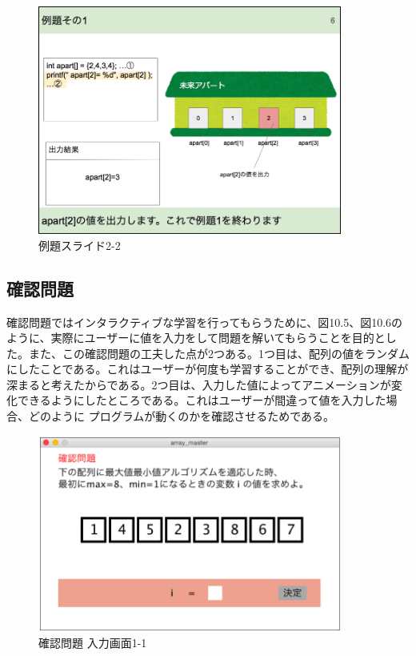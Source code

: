 \documentclass[openany,11pt,papersize]{jsbook}
\begin{document}
\begin{figure}[H]
\begin{center}
\includegraphics[width=10cm, bb=0 0 850 639]{img/10thParagraph/reidai_03.png}
\end{center}
\caption{例題スライド2-2}
\end{figure}


\subsection{確認問題}
確認問題ではインタラクティブな学習を行ってもらうために、図10.5、図10.6のように、実際にユーザーに値を入力をして問題を解いてもらうことを目的とした。また、この確認問題の工夫した点が2つある。1つ目は、配列の値をランダムにしたことである。これはユーザーが何度も学習することができ、配列の理解が深まると考えたからである。2つ目は、入力した値によってアニメーションが変化できるようにしたところである。これはユーザーが間違って値を入力した場合、どのように
プログラムが動くのかを確認させるためである。


\begin{figure}[H]
\begin{center}
\includegraphics[width=10cm, bb=0 0 798 516]{img/10thParagraph/kakuninmondai_01.png}
\end{center}
\caption{確認問題 入力画面1-1}
\end{figure}
\end{document}

